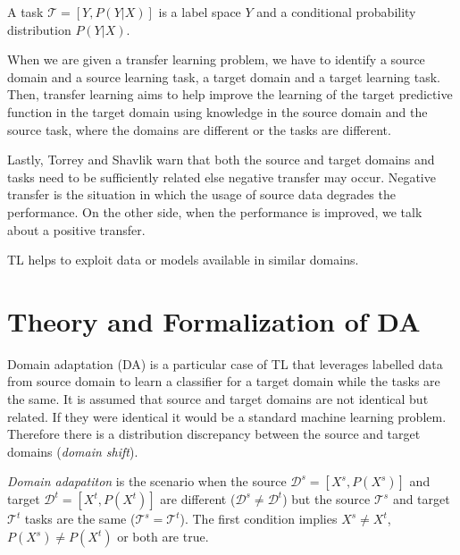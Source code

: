 \begin{definition}
	A task \(\mathcal{T} = [Y, P(Y | X)]\)
	is a label space \(Y\)
	and a conditional probability distribution \(P(Y | X)\).~\cite{pan2010}
\end{definition}

When we are given a transfer learning problem,
we have to identify a source domain and a source learning task,
a target domain and a target learning task.
Then, transfer learning aims to help improve the learning of the target predictive function in the target domain using knowledge in the source domain and the source task,
where the domains are different or the tasks are different.~\cite{pan2010}

Lastly, Torrey and Shavlik warn that both the source and target domains and tasks need to be sufficiently related
else negative transfer may occur.
Negative transfer is the situation in which the usage of source data degrades the performance.
On the other side, when the performance is improved,
we talk about a positive transfer.~\cite{torrey2010}

TL helps to exploit data or models available in similar domains.~\cite{csurka2017}

\section{Theory and Formalization of DA}

Domain adaptation (DA) is a particular case of TL
that leverages labelled data from source domain to learn a classifier for a target domain while the tasks are the same.
It is assumed that source and target domains are not identical but related.
If they were identical it would be a standard machine learning problem.
Therefore there is a distribution discrepancy between the source and target domains (\textit{domain shift}).~\cite{csurka2017}

\begin{definition}
	\textit{Domain adapatiton} is the scenario when the source
	\(\mathcal{D}^s = [X^s, P(X^s)]\)
	and target \(\mathcal{D}^t = [X^t, P(X^t)]\)
	are different (\(\mathcal{D}^s \ne \mathcal{D}^t\))
	but the source \(\mathcal{T}^s\) and target \(\mathcal{T}^t\)
	tasks are the same (\(\mathcal{T}^s = \mathcal{T}^t\)).
	The first condition implies \(X^s \ne X^t\),
	\(P(X^s) \ne P(X^t)\) or both are true.~\cite{pan2010}
\end{definition}

